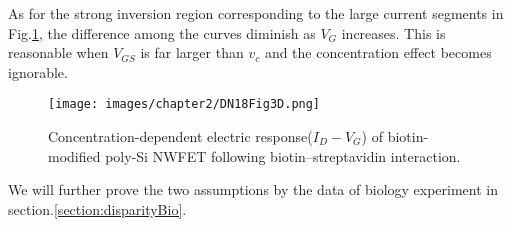 As for the strong inversion region corresponding to the large current segments in Fig.\ref{fig:DN17Fig6d}, the difference among the curves diminish as $V_G$ increases.
This is reasonable when $V_{GS}$ is far larger than $v_c$ and the concentration effect becomes ignorable.
\begin{figure}[!htbp]
    \centering
    \texttt{[image: images/chapter2/DN18Fig3D.png]}
    \caption{Concentration-dependent electric response($I_D-V_G$) of biotin-modified poly-Si NWFET following biotin–streptavidin interaction.\cite{DN17}}
    \label{fig:DN17Fig6d}
\end{figure}

We will further prove the two assumptions by the data of biology experiment in section.\ref{section:disparityBio}.









%
